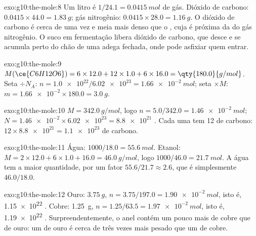 \begin{solution}{exo:g10:the-mole:8}
Um litro é $1/24.1 = \qty{0.0415}{mol}$ de gás. Dióxido de carbono:
$0.0415 \times 44.0 = \qty{1.83}{g}$; gás nitrogênio:
$0.0415 \times 28.0 = \qty{1.16}{g}$. O dióxido de carbono é cerca de
uma vez e meia mais denso que o , cuja  é próxima da do gás
nitrogênio. O suco em fermentação libera dióxido de carbono, que desce e
se acumula perto do chão de uma adega fechada, onde pode asfixiar quem
entrar.
\end{solution}

\begin{solution}{exo:g10:the-mole:9}
$M(\ce{C6H12O6}) = 6 \times 12.0 + 12 \times 1.0 + 6 \times 16.0 =
\qty{180.0}{g/mol}$. Seta $\div N_A$: $n = \num{1.0e22} / \num{6.02e23} =
\qty{1.66e-2}{mol}$; seta $\times M$: $m = \num{1.66e-2} \times 180.0 =
\qty{3.0}{g}$.
\end{solution}

\begin{solution}{exo:g10:the-mole:10}
$M = \qty{342.0}{g/mol}$, logo $n = 5.0 / 342.0 = \qty{1.46e-2}{mol}$;
$N = \num{1.46e-2} \times \num{6.02e23} = \num{8.8e21}$ . Cada
uma tem 12  de carbono: $12 \times \num{8.8e21} = \num{1.1e23}$  de carbono.
\end{solution}

\begin{solution}{exo:g10:the-mole:11}
Água: $1000 / 18.0 = \qty{55.6}{mol}$. Etanol:
$M = 2 \times 12.0 + 6 \times 1.0 + 16.0 = \qty{46.0}{g/mol}$, logo
$1000 / 46.0 = \qty{21.7}{mol}$. A água tem a maior quantidade, por um
fator $55.6 / 21.7 \approx 2.6$, que é simplesmente $46.0 / 18.0$.
\end{solution}

\begin{solution}{exo:g10:the-mole:12}
Ouro: $\qty{3.75}{g}$, $n = 3.75 / 197.0 = \qty{1.90e-2}{mol}$, isto é,
\num{1.15e22} . Cobre: \qty{1.25}{g},
$n = 1.25 / 63.5 = \qty{1.97e-2}{mol}$, isto é, \num{1.19e22} .
Surpreendentemente, o anel contém um pouco mais  de cobre que de
ouro: um  de ouro é cerca de três vezes mais pesado que um  de
cobre.
\end{solution}

